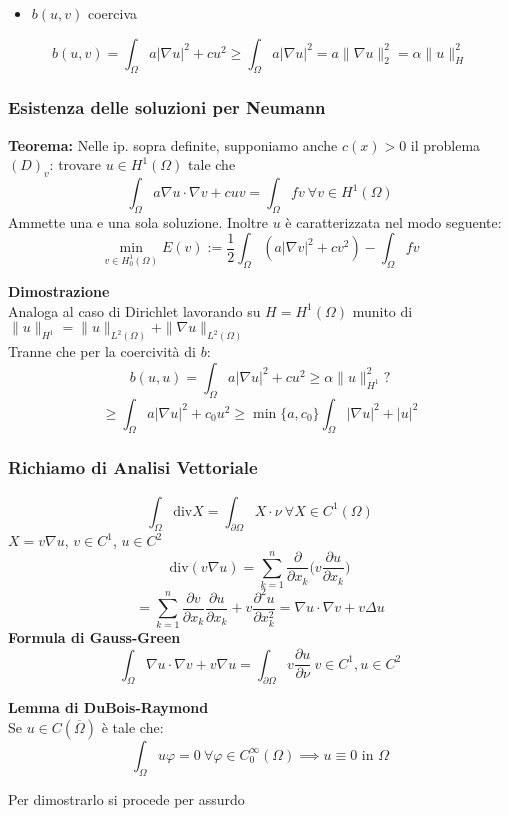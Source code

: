 \begin{itemize}
	\item $b(u,v)$ coerciva

\end{itemize}
\[b(u,v)=\int_{\Omega}^{} a|\nabla u|^2+cu^2\ge \int_{\Omega}^{} a|\nabla u|^2=a\|\nabla u\|_2^2=\alpha \|u\|^2_H  \]

\subsubsection{Esistenza delle soluzioni per Neumann}
\begin{tcolorbox}
	\textbf{Teorema: }Nelle ip. sopra definite, supponiamo anche $c(x)>0$ il problema $(D)_v$: trovare $u\in H^1(\Omega)$ tale che
	\[\int_{\Omega}^{} a\nabla u\cdot \nabla v+cuv=\int_{\Omega}^{} fv\ \forall v\in H^1(\Omega)\]
	Ammette una e una sola soluzione. Inoltre $u$ è caratterizzata nel modo seguente:
	\[\min_{v\in H_0^1(\Omega)}E(v):=\frac{1}{2}\int_{\Omega}^{} (a|\nabla v|^2+cv^2)-\int_{\Omega}^{} fv\]

\end{tcolorbox}
\textbf{Dimostrazione} 
\\Analoga al caso di Dirichlet lavorando su $H=H^1(\Omega)$ munito di $\|u\|_{H^1}=\|u\|_{L^{2}(\Omega)}+\|\nabla u\|_{L^{2}(\Omega)}$
\\Tranne che per la coercività di $b$:
\[b(u,u)=\int_{\Omega}^{} a|\nabla u|^2+cu^2\ge \alpha\|u\|_{H^1}^2?\]
\[\ge \int_{\Omega}^{} a|\nabla u|^2+c_0u^2\ge \min \{a,c_0\} \int_{\Omega}^{} |\nabla u|^2+|u|^2\]
\subsubsection{Richiamo di Analisi Vettoriale}
\[\int_{\Omega}^{} \text{div}X=\int_{\partial \Omega}^{} X\cdot \nu \ \forall X\in C^1(\Omega)\]
$X=v\nabla u$, $v\in C^1$, $u\in C^2$
\[\text{div}(v\nabla u)=\sum_{k=1}^{n} \frac{\partial }{\partial x_k} \bigg(v \frac{\partial u}{\partial x_k} \bigg)\]\[=\sum_{k=1}^{n} \frac{\partial v}{\partial x_k} \frac{\partial u}{\partial x_k} +v \frac{\partial ^2u}{\partial x_k^2} =\nabla u\cdot \nabla v+v\Delta u\]
\textbf{Formula di Gauss-Green}
\[\int_{\Omega}^{} \nabla u\cdot \nabla v+v\nabla u=\int_{\partial \Omega}^{} v \frac{\partial u}{\partial \nu} \ v\in C^1,u\in C^2\]

\begin{tcolorbox}
\textbf{Lemma di DuBois-Raymond}
\\Se $u\in C(\overline{\Omega})$ è tale che:
\[\int_{\Omega}^{} u\varphi=0\ \forall \varphi\in C_0^\infty(\Omega)\implies u\equiv0\text{ in }\Omega\] 
\end{tcolorbox}
Per dimostrarlo si procede per assurdo
